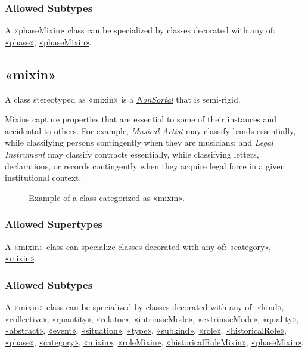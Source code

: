 \subsubsection{Allowed Subtypes}

A «phaseMixin» class can be specialized by classes decorated with any of:
\hyperref[stereotype:phase]{«phase»}, \hyperref[stereotype:phaseMixin]{«phaseMixin»}.

\subsection{«mixin»}
\label{stereotype:mixin}

A class stereotyped as «mixin» is a \hyperref[stereotype:nonSortal]{\textit{NonSortal}} that is semi-rigid.

Mixins capture properties that are essential to some of their instances and accidental to others. For example, \textit{Musical Artist} may classify bands essentially, while classifying persons contingently when they are musicians; and \textit{Legal Instrument} may classify contracts essentially, while classifying letters, declarations, or records contingently when they acquire legal force in a given institutional context.

\begin{figure}[h]
    \centering
    
    \caption{Example of a class categorized as «mixin».}
    \label{fig:mixin-example}
\end{figure}

\subsubsection{Allowed Supertypes}
A «mixin» class can specialize classes decorated with any of: 
\hyperref[stereotype:category]{«category»}, \hyperref[stereotype:mixin]{«mixin»}.

\subsubsection{Allowed Subtypes}

A «mixin» class can be specialized by classes decorated with any of:
\hyperref[stereotype:kind]{«kind»}, \hyperref[stereotype:collective]{«collective»}, \hyperref[stereotype:quantity]{«quantity»}, \hyperref[stereotype:relator]{«relator»}, \hyperref[stereotype:intrinsicMode]{«intrinsicMode»}, \hyperref[stereotype:extrinsicMode]{«extrinsicMode»}, \hyperref[stereotype:quality]{«quality»}, \hyperref[stereotype:abstract]{«abstract»}, \hyperref[stereotype:event]{«event»}, \hyperref[stereotype:situation]{«situation»}, \hyperref[stereotype:type]{«type»}, \hyperref[stereotype:subkind]{«subkind»}, \hyperref[stereotype:role]{«role»}, \hyperref[stereotype:historicalRole]{«historicalRole»}, \hyperref[stereotype:phase]{«phase»}, \hyperref[stereotype:category]{«category»}, \hyperref[stereotype:mixin]{«mixin»}, \hyperref[stereotype:roleMixin]{«roleMixin»}, \hyperref[stereotype:historicalRoleMixin]{«historicalRoleMixin»}, \hyperref[stereotype:phaseMixin]{«phaseMixin»}.

